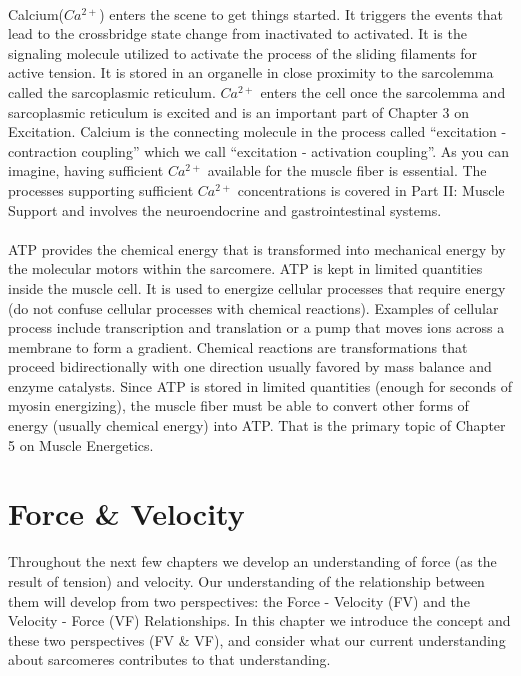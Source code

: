 \paragraph{} 
Calcium($Ca^{2+}$) enters the scene to get things started. It triggers the events that lead to the crossbridge state change from inactivated to activated. It is the signaling molecule utilized to activate the process of the sliding filaments for active tension. It is stored in an organelle in close proximity to the sarcolemma called the sarcoplasmic reticulum. $Ca^{2+}$ enters the cell once the sarcolemma and sarcoplasmic reticulum is excited and is an important part of Chapter 3 on Excitation. Calcium is the connecting molecule in the process called “excitation - contraction coupling” which we call “excitation - activation coupling”. As you can imagine, having sufficient $Ca^{2+}$ available for the muscle fiber is essential. The processes supporting sufficient $Ca^{2+}$ concentrations is covered in Part II: Muscle Support and involves the neuroendocrine and gastrointestinal systems. 

\paragraph{}
ATP provides the chemical energy that is transformed into mechanical energy by the molecular motors within the sarcomere. ATP is kept in limited quantities inside the muscle cell. It is used to energize cellular processes that require energy (do not confuse cellular processes with chemical reactions). Examples of cellular process include transcription and translation or a pump that moves ions across a membrane to form a gradient. Chemical reactions are transformations that proceed bidirectionally with one direction usually favored by mass balance and enzyme catalysts. Since ATP is stored in limited quantities (enough for seconds of myosin energizing), the muscle fiber must be able to convert other forms of energy (usually chemical energy) into ATP. That is the primary topic of Chapter 5 on Muscle Energetics.


\section{Force \& Velocity}

Throughout the next few chapters we develop an understanding of force (as the result of tension) and velocity. Our understanding of the relationship between them will develop from two perspectives: the Force - Velocity (FV) and the Velocity - Force (VF) Relationships. In this chapter we introduce the concept and these two perspectives (FV \& VF), and consider what our current understanding about sarcomeres contributes to that understanding.

